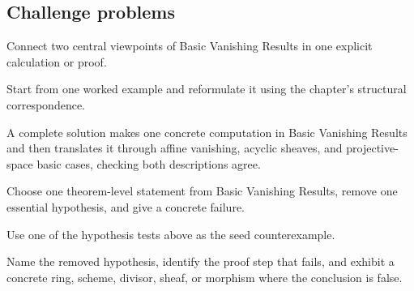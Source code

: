 \subsection*{Challenge problems}

\begin{exercise}\label{exr:vi49-expand-15}
Connect two central viewpoints of Basic Vanishing Results in one explicit calculation or proof.
\end{exercise}
\begin{hint}
Start from one worked example and reformulate it using the chapter's structural correspondence.
\end{hint}
\begin{solution}
A complete solution makes one concrete computation in Basic Vanishing Results and then translates it through affine vanishing, acyclic sheaves, and projective-space basic cases, checking both descriptions agree.
\end{solution}

\begin{exercise}\label{exr:vi49-expand-16}
Choose one theorem-level statement from Basic Vanishing Results, remove one essential hypothesis, and give a concrete failure.
\end{exercise}
\begin{hint}
Use one of the hypothesis tests above as the seed counterexample.
\end{hint}
\begin{solution}
Name the removed hypothesis, identify the proof step that fails, and exhibit a concrete ring, scheme, divisor, sheaf, or morphism where the conclusion is false.
\end{solution}

